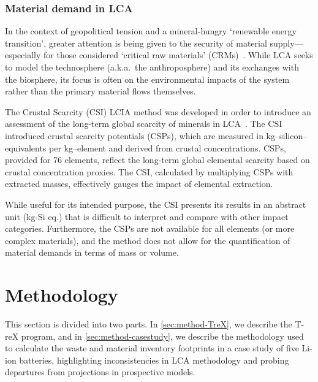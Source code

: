 \documentclass[a4paper,fleqn,longmktitle]{cas-dc}
\begin{document}
\subsubsection{Material demand in LCA}\label{sec:intro-material}

In the context of geopolitical tension and a mineral-hungry `renewable energy transition', greater attention is being given to the security of material supply---especially for those considered `critical raw materials' (CRMs)~\citep{eu2023crmstudy,hool2023crm,mancini2013supplysecurity,jrc2023supplychain,hartley2024cepolitics,salviulo2021supplychain,iea2023crm,iea2023energytechperspectives}. While LCA seeks to model the technosphere (a.k.a.\ the anthroposphere) and its exchanges with the biosphere, its focus is often on the environmental impacts of the system rather than the primary material flows themselves.

The Crustal Scarcity (CSI) LCIA method was developed in order to introduce an assessment of the long-term global scarcity of minerals in LCA~\citep{arvidsson2020csi}. The CSI introduced crustal scarcity potentials (CSPs), which are measured in kg--silicon--equivalents per kg--element and derived from crustal concentrations. CSPs, provided for 76 elements, reflect the long-term global elemental scarcity based on crustal concentration proxies. The CSI, calculated by multiplying CSPs with extracted masses, effectively gauges the impact of elemental extraction.

While useful for its intended purpose, the CSI presents its results in an abstract unit (kg-Si eq.) that is difficult to interpret and compare with other impact categories. Furthermore, the CSPs are not available for all elements (or more complex materials), and the method does not allow for the quantification of material demands in terms of mass or volume.


\section{Methodology}\label{sec:methodology}

This section is divided into two parts. In \autoref{sec:method-TreX}, we describe the T-reX program, and in \autoref{sec:method-casestudy}, we describe the methodology used to calculate the waste and material inventory footprints in a case study of five Li-ion batteries, highlighting inconsistencies in LCA methodology and probing departures from projections in prospective models.
\end{document}
